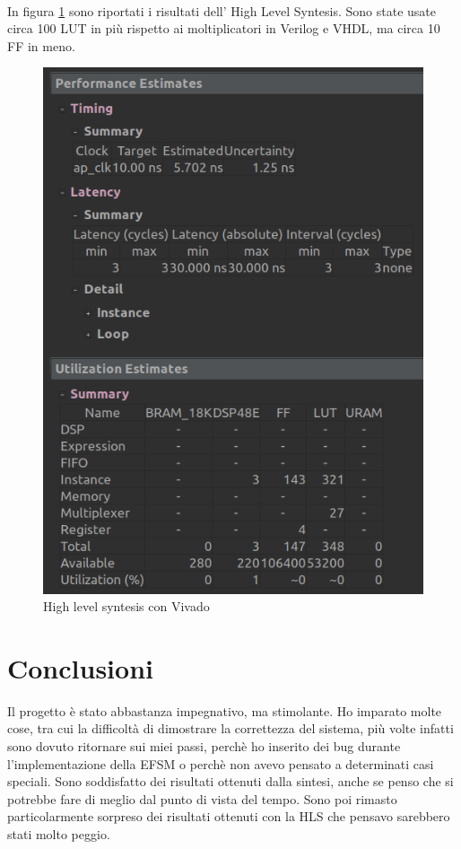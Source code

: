 \documentclass[]{IEEEtran}
\begin{document}
\\In figura \ref{fig:HLS} sono riportati i risultati dell' High Level Syntesis. Sono state usate circa 100 LUT in più rispetto ai moltiplicatori in Verilog e VHDL, ma circa 10 FF in meno. 
\begin{figure}[!htb]
    \centering
    \includegraphics[width=0.5\linewidth]{figures/hls}
    \caption{High level syntesis con Vivado}
    \label{fig:HLS}
\end{figure}



\section{Conclusioni}
Il progetto è stato abbastanza impegnativo, ma stimolante. Ho imparato molte cose, tra cui la difficoltà di dimostrare la correttezza del sistema, più volte infatti sono dovuto ritornare sui miei passi, perchè ho inserito dei bug durante l'implementazione della EFSM o perchè non avevo pensato a determinati casi speciali. Sono soddisfatto dei risultati ottenuti dalla sintesi, anche se penso che si potrebbe fare di meglio dal punto di vista del tempo. Sono poi rimasto particolarmente sorpreso dei risultati ottenuti con la HLS che pensavo sarebbero stati molto peggio.



\nocite{*}


\appendix
\end{document}
